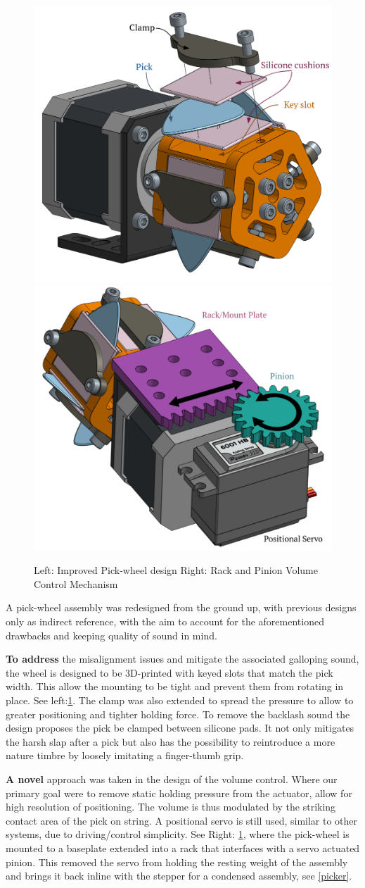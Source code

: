 \documentclass[a4paper,11pt]{article}
\begin{document}
\begin{figure}[h!]
  \begin{center}
    \includegraphics[width=.4\textwidth]{images/picker_explode.png}
    \includegraphics[width=.4\textwidth]{images/volume_explode.png}
    \label{Pick/Vol}
    \caption{Left: Improved Pick-wheel design Right: Rack and Pinion Volume Control Mechanism}
  \end{center}
\end{figure}

A pick-wheel assembly was redesigned from the ground up, with previous designs only as indirect reference, with the aim to account for the aforementioned drawbacks and keeping quality of sound in mind.

\textbf{To address} the misalignment issues and mitigate the associated galloping sound, the wheel is designed to be 3D-printed with keyed slots that match the pick width. This allow the mounting to be tight and prevent them from rotating in place. See left:\ref{Pick/Vol}. The clamp was also extended to spread the pressure to allow to greater positioning and tighter holding force.
To remove the backlash sound the design proposes the pick be clamped between silicone pads. It not only mitigates the harsh slap after a pick but also has the possibility to reintroduce a more nature timbre by loosely imitating a finger-thumb grip.

\textbf{A novel} approach was taken in the design of the volume control. Where our primary goal were to remove static holding pressure from the actuator, allow for high resolution of positioning. The volume is thus modulated by the striking contact area of the pick on string. A positional servo is still used, similar to other systems, due to driving/control simplicity. See Right: \ref{Pick/Vol}, where the pick-wheel is mounted to a baseplate extended into a rack that interfaces with a servo actuated pinion. This removed the servo from holding the resting weight of the assembly and brings it back inline with the stepper for a condensed assembly, see \ref{picker}.
\end{document}
